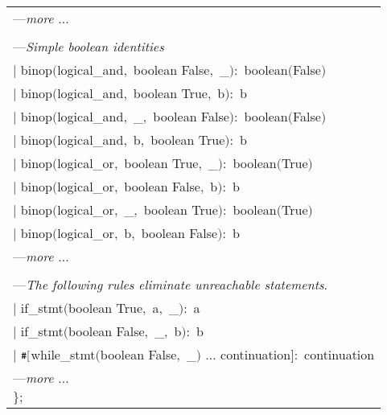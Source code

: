 {\begin{tabular}{l}
---{\em  more $.$$.$$.$}\\
\\
---{\em  Simple boolean identities}\\
$|$  binop$($logical\_and$,$ boolean False$,$ \_$)$$:$ boolean$($False$)$\\
$|$  binop$($logical\_and$,$ boolean True$,$ b$)$$:$  b\\
$|$  binop$($logical\_and$,$ \_$,$ boolean False$)$$:$ boolean$($False$)$\\
$|$  binop$($logical\_and$,$ b$,$ boolean True$)$$:$  b\\
$|$  binop$($logical\_or$,$  boolean True$,$ \_$)$$:$  boolean$($True$)$\\
$|$  binop$($logical\_or$,$  boolean False$,$ b$)$$:$ b\\
$|$  binop$($logical\_or$,$  \_$,$ boolean True$)$$:$  boolean$($True$)$\\
$|$  binop$($logical\_or$,$  b$,$ boolean False$)$$:$ b\\
---{\em  more $.$$.$$.$}\\
\\
---{\em  The following rules eliminate unreachable statements$.$ }\\
$|$  if\_stmt$($boolean True$,$ a$,$ \_$)$$:$          a\\
$|$  if\_stmt$($boolean False$,$ \_$,$ b$)$$:$         b\\
$|$  $\verb.#.[$while\_stmt$($boolean False$,$ \_$)$ $.$$.$$.$ continuation$]$$:$ continuation\\
---{\em  more $.$$.$$.$}\\
$\}$$;$\\
\end{tabular}}

